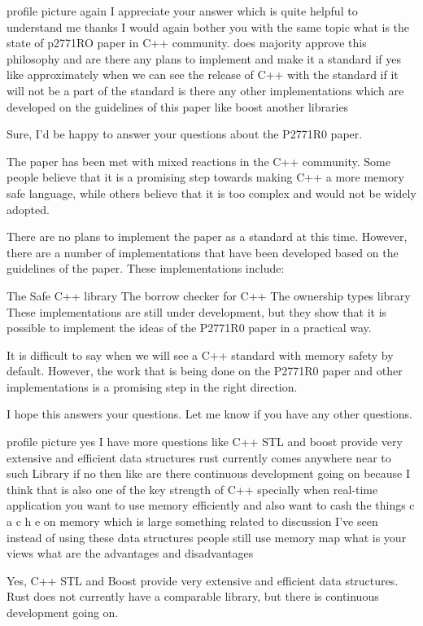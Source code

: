\documentclass[11pt]{article}
\begin{document}
profile picture
again I appreciate your
answer which is quite helpful to understand me thanks I would again bother you with the same topic
what is the state of p2771RO paper in C++ community.
does majority approve this philosophy and
are there any plans to implement
and make it a standard if yes like approximately
when we can see the
release of C++ with the standard
if it will not be a part of the standard is there any
other implementations which
are developed on
the guidelines of this paper
like boost another
libraries

Sure, I'd be happy to answer your questions about the P2771R0 paper.

The paper has been met with mixed reactions in the C++ community. Some people believe that it is a promising step towards making C++ a more memory safe language, while others believe that it is too complex and would not be widely adopted.

There are no plans to implement the paper as a standard at this time. However, there are a number of implementations that have been developed based on the guidelines of the paper. These implementations include:

The Safe C++ library
The borrow checker for C++
The ownership types library
These implementations are still under development, but they show that it is possible to implement the ideas of the P2771R0 paper in a practical way.

It is difficult to say when we will see a C++ standard with memory safety by default. However, the work that is being done on the P2771R0 paper and other implementations is a promising step in the right direction.

I hope this answers your questions. Let me know if you have any other questions.

profile picture
yes I have more questions
like
C++
STL
and boost
provide very extensive
and efficient data structures
rust
currently
comes anywhere near to
such Library
if no then like
are there continuous development going on
because I think that is also one of the
key strength of C++
specially when
real-time application you want to use memory efficiently
and also want to
cash the things
c a c h e
on memory
which is
large
something related to discussion
I've seen
instead of using these data structures
people still use memory map
what is your views what are the advantages and disadvantages

Yes, C++ STL and Boost provide very extensive and efficient data structures. Rust does not currently have a comparable library, but there is continuous development going on.
\end{document}
